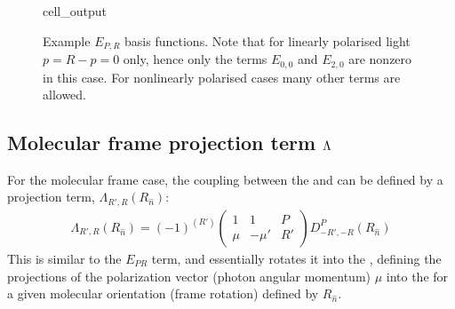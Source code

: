 \documentclass[letterpaper,table,10pt,english]{jupyterBook}
\begin{document}
\begin{figure}[htbp]
\centering
\capstart
\begin{sphinxVerbatimOutput}

\begin{sphinxuseclass}{cell_output}
\noindent{}

\end{sphinxuseclass}\end{sphinxVerbatimOutput}
\caption{Example \(E_{P,R}\) basis functions. Note that for linearly polarised light \(p=R-p=0\) only, hence only the terms \(E_{0,0}\) and \(E_{2,0}\) are non\sphinxhyphen{}zero in this case. For non\sphinxhyphen{}linearly polarised cases many other terms are allowed.}\label{\detokenize{part1/theory_tensor_formalism_201122:fig-epr-basis}}\end{figure}


\subsection{Molecular frame projection term \protect\(\Lambda\protect\)}
\label{\detokenize{part1/theory_tensor_formalism_201122:molecular-frame-projection-term-lambda}}\label{\detokenize{part1/theory_tensor_formalism_201122:sec-theory-lambda-term}}
\sphinxAtStartPar
For the molecular frame case, the coupling between the {\hyperref[\detokenize{backmatter/glossary:term-LF}]{}} and {\hyperref[\detokenize{backmatter/glossary:term-MF}]{}} can be defined by a projection term, \(\Lambda_{R',R}(R_{\hat{n}})\):
\begin{equation}\label{equation:part1/theory_tensor_formalism_201122:eq:basis-lambda-MF-defn}
\begin{split}
\Lambda_{R',R}(R_{\hat{n}})=(-1)^{(R')}\left(\begin{array}{ccc}
1 & 1 & P\\
\mu & -\mu' & R'
\end{array}\right)D_{-R',-R}^{P}(R_{\hat{n}})
\end{split}
\end{equation}
\sphinxAtStartPar
This is similar to the \(E_{PR}\) term, and essentially rotates it into the {\hyperref[\detokenize{backmatter/glossary:term-MF}]{}}, defining the projections of the polarization vector (photon angular momentum) \(\mu\) into the {\hyperref[\detokenize{backmatter/glossary:term-MF}]{}} for a given molecular orientation (frame rotation) defined by \(R_{\hat{n}}\).
\end{document}
